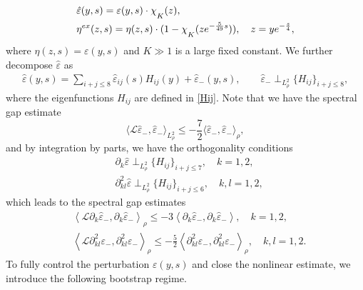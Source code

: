 \documentclass[11pt,reqno]{amsart}
\theoremstyle{definition}
\theoremstyle{bfremark}
\numberwithin{equation}{section}
\newcommand{\veph}{\hat\varepsilon }
\newcommand{\mchi}{\raisebox{0pt}[1ex][1ex]{$\chi$}}
\begin{document}
\begin{align}
    &\veph(y,s)=\varepsilon(y,s) \cdot \mchi_{K}(z),\label{eq:decomin}\\
    &\eta^{ex}(z,s)=\eta(z,s) \cdot(1-\mchi_K(ze^{-\frac{5}{49}s})), \quad z=ye^{-\frac{s}{4}}, \label{eq:outdec}
\end{align}
where \(\eta(z,s)=\varepsilon(y,s)\) and \(K \gg 1\) is a large fixed constant. We further decompose \(\veph\) as 
\begin{align}
    \veph(y,s)=\sum_{i+j \leq 8}\veph_{ij}(s)H_{ij}(y)+\veph_-(y,s),\label{decomoin} \quad \quad \veph_- \perp_{L^2_\rho} \{H_{ij}\}_{i+j \leq 8},
\end{align}
where the eigenfunctions \(H_{ij}\) are defined in \ref{Hij}. Note that we have the spectral gap estimate
\begin{equation}
\label{inq:spec gap}
    \langle \mathcal{L} \veph_-, \veph_- \rangle_{L^2_\rho} \leq  - \frac{7}{2}\langle\veph_-,\veph_-\rangle_{\rho},
\end{equation}
and by integration by parts, we have the orthogonality conditions
\begin{align}
    & \partial_k\veph \perp_{L^2_\rho} \{H_{ij}\}_{i+j \leq 7}, \quad k=1,2, \label{con:orth 1}\\
    & \partial^2_{kl}\veph \perp_{L^2_\rho} \{H_{ij}\}_{i+j \leq 6}, \quad k,l=1,2,\label{con:orth 2}
\end{align}
which leads to the spectral gap estimates
\begin{align}
    &\left<\mathcal{L} \partial_k \veph_-,\partial_k \veph_-\right>_{\rho} \leq -3\left<\partial_k \veph_-,\partial_k \veph_-\right>, \quad k=1,2,\label{inq:spec partial i}\\
    &\left<\mathcal{L}\partial^2_{kl}\varepsilon_-,\partial^2_{kl}\varepsilon_-\right>_{\rho} \leq -\frac{5}{2}\left<\partial^2_{kl}\varepsilon_-,\partial^2_{kl}\varepsilon_-\right>_{\rho}, \quad k,l=1,2. \label{inq:spec partial ij}
\end{align}
To fully control the perturbation
\(\varepsilon(y,s)\) and close the nonlinear estimate, we introduce the following bootstrap regime.
\end{document}
